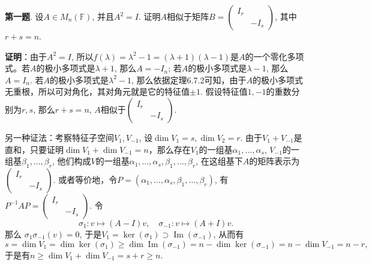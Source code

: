 
\renewcommand{\newpageorvspace}{\vspace{2em}}

\date{2022-3-25  第二次习题课}



\maketitle

{\bf 第一题}. 设$A \in M_n (\mathbb{F})$, 并且$A^2 = I$. 证明$A$相似于矩阵$B = \begin{pmatrix} I_r & \\ & -I_s \end{pmatrix}$, 其中$r+s=n$.

{\bf 证明}：由于$A^2 = I$, 所以$f(\lambda) = \lambda^2 - 1 = (\lambda + 1) (\lambda - 1)$是$A$的一个零化多项式。若$A$的极小多项式是$\lambda + 1$, 那么$A = -I_n$; 若$A$的极小多项式是$\lambda - 1$, 那么$A = I_n$. 若$A$的极小多项式是$\lambda^2 - 1$, 那么依据定理6.7.2可知，由于$A$的极小多项式无重根，所以可对角化，其对角元就是它的特征值$\pm 1$. 假设特征值$1, -1$的重数分别为$r,s$, 那么$r+s = n$, $A$相似于$\begin{pmatrix} I_r & \\ & -I_s \end{pmatrix}$.

另一种证法：考察特征子空间$V_1, V_{-1}$, 设$\dim V_1 = s, \dim V_2 = r$. 由于$V_1 + V_{-1}$是直和，只要证明$\dim V_1 + \dim V_{-1} = n$，那么存在$V_1$的一组基$\alpha_1, \ldots, \alpha_s$, $V_{-1}$的一组基$\beta_1, \ldots, \beta_r$, 他们构成$V$的一组基$\alpha_1, \ldots, \alpha_s, \beta_1, \ldots, \beta_r$, 在这组基下$A$的矩阵表示为$\begin{pmatrix} I_r & \\ & -I_s \end{pmatrix}$. 或者等价地，令$P = (\alpha_1, \ldots, \alpha_s, \beta_1, \ldots, \beta_r)$, 有$P^{-1}AP = \begin{pmatrix} I_r & \\ & -I_s \end{pmatrix}$. 令
$$\sigma_1: v \mapsto (A-I)v, \quad \sigma_{-1}: v \mapsto (A+I)v.$$
那么
$\sigma_1\sigma_{-1}(v) = 0$, 于是$V_1 = \ker (\sigma_1) \supset \operatorname{Im} (\sigma_{-1})$, 从而有
$$s = \dim V_1 = \dim \ker (\sigma_1) \geqslant \dim \operatorname{Im} (\sigma_{-1}) = n - \dim \ker (\sigma_{-1}) = n - \dim V_{-1} = n - r,$$
于是有$n \geqslant \dim V_1 + \dim V_{-1} = s + r \geqslant n$.


